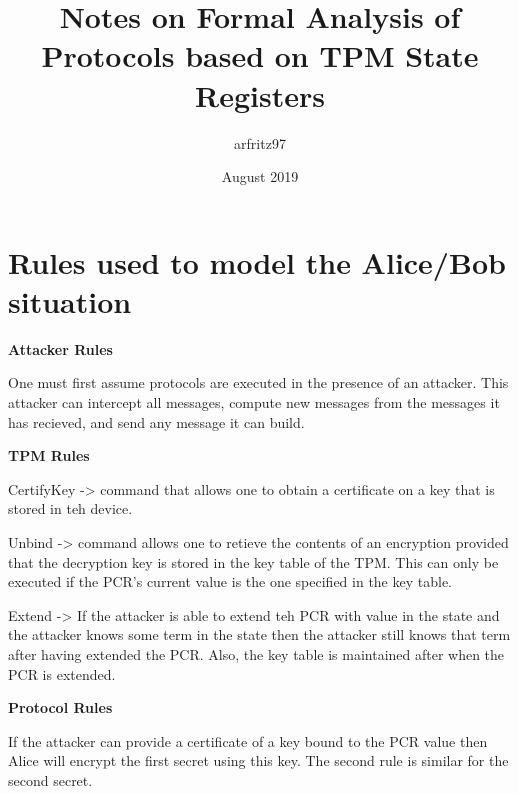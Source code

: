 \documentclass{article}
\title{Notes on Formal Analysis of Protocols based on TPM State Registers}
\author{arfritz97 }
\date{August 2019}
\begin{document}
\section {Rules used to model the Alice/Bob situation}

\textbf {Attacker Rules}

One must first assume protocols are executed in the presence
of an attacker. This attacker can intercept all messages,
compute new messages from the messages it has recieved,
and send any message it can build.

\textbf {TPM Rules}

CertifyKey -> command that allows one to obtain a certificate
on a key that is stored in teh device. 

Unbind -> command allows one to retieve the contents of an
encryption provided that the decryption key is stored in 
the key table of the TPM. This can only be executed if the 
PCR's current value is the one specified in the key table.

Extend -> If the attacker is able to extend teh PCR with value
in the state and the attacker knows some term in the state then
the attacker still knows that term after having extended
the PCR. Also, the key table is maintained after when the 
PCR is extended.

\textbf {Protocol Rules}

If the attacker can provide a certificate of a key bound to 
the PCR value then Alice will encrypt the first secret using 
this key. The second rule is similar for the second secret.
\end{document}
